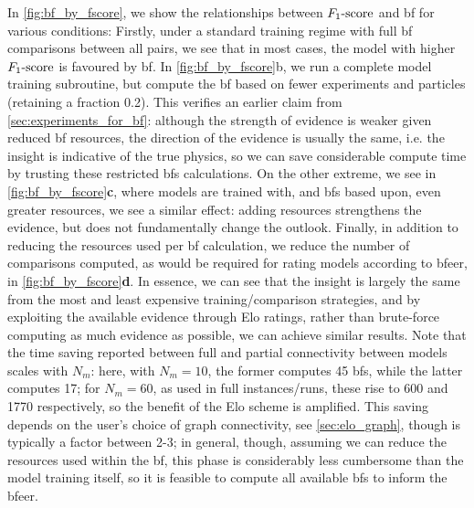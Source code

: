 In \cref{fig:bf_by_fscore}, we show the relationships between $ F_{1}\text{-score} $ and \gls{bf} for various conditions: 
Firstly, under a standard training regime with full \gls{bf} comparisons between all pairs, 
    we see that in most cases, the model with higher $ F_{1}\text{-score} $ is favoured by \gls{bf}.
In \cref{fig:bf_by_fscore}b, we run a complete model training subroutine, but compute the \gls{bf} based on fewer experiments and particles 
    (retaining a fraction 0.2).
This verifies an earlier claim from \cref{sec:experiments_for_bf}: 
    although the strength of evidence is weaker given reduced \gls{bf} resources, 
    the direction of the evidence is usually the same, i.e. the insight is indicative of the true physics, 
    so we can save considerable compute time by trusting these restricted \glspl{bf} calculations. 
On the other extreme, we see in \cref{fig:bf_by_fscore}\textbf{c}, where models are trained with, 
    and \glspl{bf} based upon, even greater resources, we see a similar effect: 
    adding resources strengthens the evidence, but does not fundamentally change the outlook. 
Finally, in addition to reducing the resources used per \gls{bf} calculation, 
    we reduce the number of comparisons computed, as would be required for rating models according to \gls{bfeer},
    in \cref{fig:bf_by_fscore}\textbf{d}. 
In essence, we can see that the insight is largely the same 
    from the most and least expensive training/comparison strategies, 
    and by exploiting the available evidence through Elo ratings, rather than 
    brute-force computing as much evidence as possible, we can achieve similar results. 
Note that the time saving reported between full and partial connectivity between models scales with $N_m$: 
    here, with $N_m=10$, the former computes 45 \glspl{bf}, while the latter computes 17;
    for $N_m=60$, as used in full instances/runs, these rise to 600 and 1770 respectively, 
    so the benefit of the Elo scheme is amplified. 
This saving depends on the user's choice of graph connectivity, see \cref{sec:elo_graph}, 
    though is typically a factor between 2-3;
    in general, though, assuming we can reduce the resources used within the \gls{bf}, 
    this phase is considerably less cumbersome than the model training itself, so 
    it is feasible to compute all available \glspl{bf} to inform the \gls{bfeer}.

